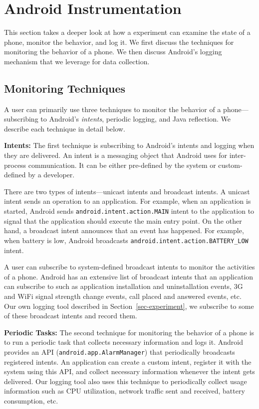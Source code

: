 \section{Android Instrumentation}
\label{sec-logging}

This section takes a deeper look at how a \PhoneLab{} experiment can examine the
state of a phone, monitor the behavior, and log it. We first discuss the
techniques for monitoring the behavior of a phone. We then discuss Android's
logging mechanism that we leverage for data collection.

\subsection{Monitoring Techniques}

A \PhoneLab{} user can primarily use three techniques to monitor the behavior of
a phone---subscribing to Android's {\it intents}, periodic logging, and Java
reflection. We describe each technique in detail below.

{\bf Intents:} The first technique is subscribing to Android's intents and
logging when they are delivered. An intent is a messaging object that Android
uses for inter-process communication. It can be either pre-defined by the system
or custom-defined by a developer.

There are two types of intents---unicast intents and broadcast intents. A
unicast intent sends an operation to an application. For example, when an
application is started, Android sends \texttt{android.intent.action.MAIN} intent
to the application to signal that the application should execute the main entry
point. On the other hand, a broadcast intent announces that an event has
happened. For example, when battery is low, Android broadcasts
\texttt{android.intent.action.BATTERY\_LOW} intent.

A \PhoneLab{} user can subscribe to system-defined broadcast intents to monitor
the activities of a phone. Android has an extensive list of broadcast intents
that an application can subscribe to such as application installation and
uninstallation events, 3G and WiFi signal strength change events, call placed
and answered events, etc. Our own logging tool described in
Section~\ref{sec-experiment}, we subscribe to some of these broadcast intents
and record them.

{\bf Periodic Tasks:} The second technique for monitoring the behavior of a
phone is to run a periodic task that collects necessary information and logs it.
Android provides an API (\texttt{android.app.AlarmManager}) that periodically
broadcasts registered intents. An application can create a custom intent,
register it with the system using this API, and collect necessary information
whenever the intent gets delivered. Our logging tool also uses this technique to
periodically collect usage information such as CPU utilization, network traffic
sent and received, battery consumption, etc.


